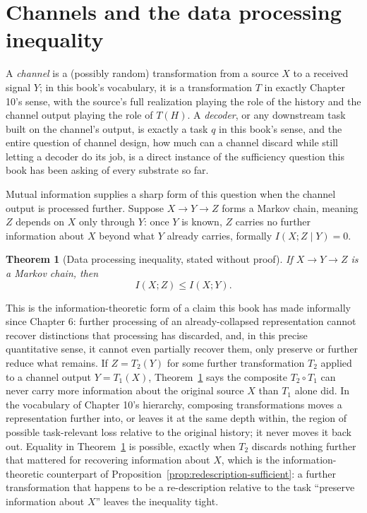 \documentclass[11pt]{book}
\newtheorem{theorem}{Theorem}[chapter]
\begin{document}
\section{Channels and the data processing inequality}

A \emph{channel} is a (possibly random) transformation from a source $X$ to a received signal $Y$; in this book's vocabulary, it is a transformation $T$ in exactly Chapter 10's sense, with the source's full realization playing the role of the history and the channel output playing the role of $T(H)$. A \emph{decoder}, or any downstream task built on the channel's output, is exactly a task $q$ in this book's sense, and the entire question of channel design, how much can a channel discard while still letting a decoder do its job, is a direct instance of the sufficiency question this book has been asking of every substrate so far.

Mutual information supplies a sharp form of this question when the channel output is processed further. Suppose $X\to Y\to Z$ forms a Markov chain, meaning $Z$ depends on $X$ only through $Y$: once $Y$ is known, $Z$ carries no further information about $X$ beyond what $Y$ already carries, formally $I(X;Z\mid Y)=0$.

\begin{theorem}[Data processing inequality, stated without proof]
\label{thm:dpi}
If $X\to Y\to Z$ is a Markov chain, then
\[
I(X;Z) \le I(X;Y).
\]
\end{theorem}

This is the information-theoretic form of a claim this book has made informally since Chapter 6: further processing of an already-collapsed representation cannot recover distinctions that processing has discarded, and, in this precise quantitative sense, it cannot even partially recover them, only preserve or further reduce what remains. If $Z=T_2(Y)$ for some further transformation $T_2$ applied to a channel output $Y=T_1(X)$, Theorem~\ref{thm:dpi} says the composite $T_2\circ T_1$ can never carry more information about the original source $X$ than $T_1$ alone did. In the vocabulary of Chapter 10's hierarchy, composing transformations moves a representation further into, or leaves it at the same depth within, the region of possible task-relevant loss relative to the original history; it never moves it back out. Equality in Theorem~\ref{thm:dpi} is possible, exactly when $T_2$ discards nothing further that mattered for recovering information about $X$, which is the information-theoretic counterpart of Proposition~\ref{prop:redescription-sufficient}: a further transformation that happens to be a re-description relative to the task ``preserve information about $X$'' leaves the inequality tight.
\end{document}
